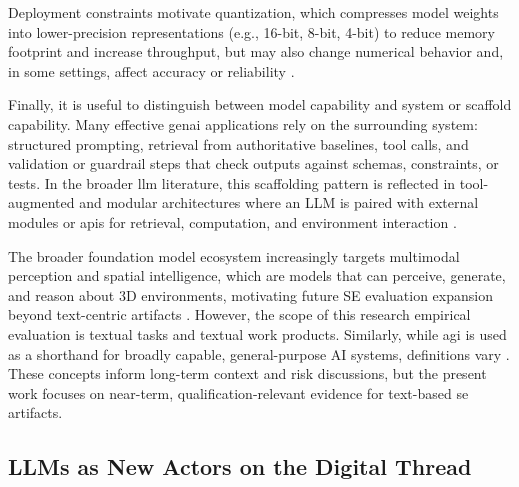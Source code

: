

Deployment constraints motivate quantization, which compresses model weights into lower-precision representations (e.g., 16-bit, 8-bit, 4-bit) to reduce memory footprint and increase throughput, but may also change numerical behavior and, in some settings, affect accuracy or reliability \cite{lang_ComprehensiveStudyQuantization_2024, zhuSurveyModelCompression2024}. 

Finally, it is useful to distinguish between model capability and system or scaffold capability. Many effective \ac{genai} applications rely on the surrounding system: structured prompting, retrieval from authoritative baselines, tool calls, and validation or guardrail steps that check outputs against schemas, constraints, or tests. In the broader \ac{llm} literature, this scaffolding pattern is reflected in tool-augmented and modular architectures where an LLM is paired with external modules or \acp{api} for retrieval, computation, and environment interaction \cite{yao_ReActSynergizingReasoningActing_2023, schick_ToolformerLanguageModelsCan_2023}. 


The broader foundation model ecosystem increasingly targets multimodal perception and spatial intelligence, which are models that can perceive, generate, and reason about 3D environments, motivating future SE evaluation expansion beyond text-centric artifacts \cite{li_WordsWorldsSpatialIntelligence_2025, worldlabs_MarbleMultimodalWorldModel_2025}. However, the scope of this research empirical evaluation is textual tasks and textual work products. Similarly, while \ac{agi} is used as a shorthand for broadly capable, general-purpose AI systems, definitions vary \cite{morris_LevelsAGIOperationalizingProgress_2025, hendrycks_DefinitionAGI_2025}. These concepts inform long-term context and risk discussions, but the present work focuses on near-term, qualification-relevant evidence for text-based \ac{se} artifacts.



\subsection{LLMs as New Actors on the Digital Thread}
\label{subsec:ch2_llm_new_actors_de_thread}

